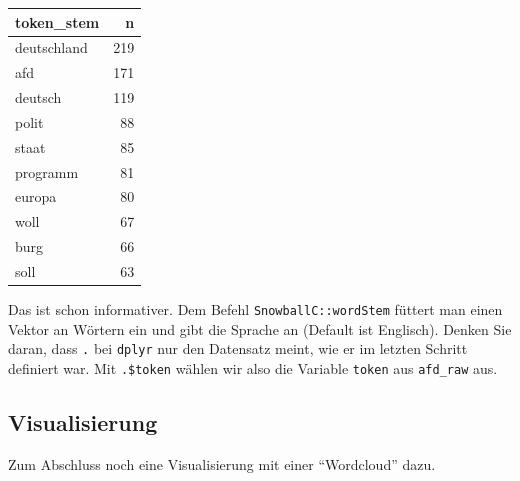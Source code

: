 \documentclass[12pt,ngerman,]{book}
\makeatletter
\newenvironment{Shaded}{\begin{snugshade}}{\end{snugshade}}
\newcommand{\KeywordTok}[1]{\textcolor[rgb]{0.13,0.29,0.53}{\textbf{{#1}}}}
\newcommand{\DataTypeTok}[1]{\textcolor[rgb]{0.13,0.29,0.53}{{#1}}}
\newcommand{\DecValTok}[1]{\textcolor[rgb]{0.00,0.00,0.81}{{#1}}}
\newcommand{\StringTok}[1]{\textcolor[rgb]{0.31,0.60,0.02}{{#1}}}
\newcommand{\OtherTok}[1]{\textcolor[rgb]{0.56,0.35,0.01}{{#1}}}
\newcommand{\NormalTok}[1]{{#1}}
\newenvironment{kframe}{%
\medskip{}
\setlength{\fboxsep}{.8em}
 \def\at@end@of@kframe{}%
 \ifinner\ifhmode%
  \def\at@end@of@kframe{\end{minipage}}%
  \begin{minipage}{\columnwidth}%
 \fi\fi%
 \def\FrameCommand##1{\hskip\@totalleftmargin \hskip-\fboxsep
 \colorbox{shadecolor}{##1}\hskip-\fboxsep
     \hskip-\linewidth \hskip-\@totalleftmargin \hskip\columnwidth}%
 \MakeFramed {\advance\hsize-\width
   \@totalleftmargin\z@ \linewidth\hsize
   \@setminipage}}%
 {\par\unskip\endMakeFramed%
 \at@end@of@kframe}
\renewenvironment{Shaded}{\begin{kframe}}{\end{kframe}}
\makeatother
\begin{document}
\begin{Shaded}
\end{Shaded}

\begin{tabular}{l|r}
\hline
token\_stem & n\\
\hline
deutschland & 219\\
\hline
afd & 171\\
\hline
deutsch & 119\\
\hline
polit & 88\\
\hline
staat & 85\\
\hline
programm & 81\\
\hline
europa & 80\\
\hline
woll & 67\\
\hline
burg & 66\\
\hline
soll & 63\\
\hline
\end{tabular}

Das ist schon informativer. Dem Befehl \texttt{SnowballC::wordStem}
füttert man einen Vektor an Wörtern ein und gibt die Sprache an (Default
ist Englisch). Denken Sie daran, dass \texttt{.} bei \texttt{dplyr} nur
den Datensatz meint, wie er im letzten Schritt definiert war. Mit
\texttt{.\$token} wählen wir also die Variable \texttt{token} aus
\texttt{afd\_raw} aus.

\subsection{Visualisierung}\label{visualisierung}

Zum Abschluss noch eine Visualisierung mit einer ``Wordcloud'' dazu.

\begin{Shaded}
\end{Shaded}
\end{document}
